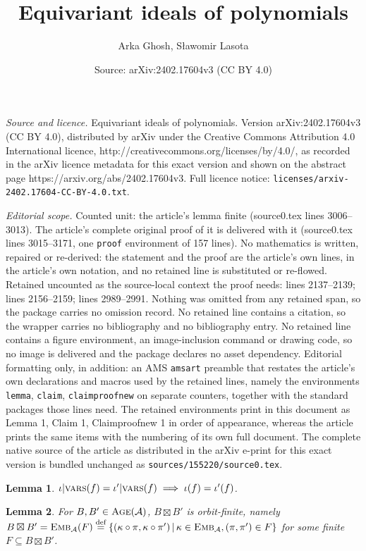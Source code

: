 \documentclass[10pt,a4paper]{amsart}
\title{Equivariant ideals of polynomials}
\author{Arka Ghosh, S{\l}awomir Lasota}
\date{Source: arXiv:2402.17604v3 (CC BY 4.0)}
\newtheorem{lemma}{Lemma}
\newcommand{\E}{{\embed{\WW}}}
\newcommand{\Vs}{B}
\newcommand{\WW}{\mathcal{A}}
\newcommand{\age}[1]{\text{\sc Age}(#1)}
\newcommand{\defeq}{\stackrel{\text{\tiny def}}{=}}
\newcommand{\embed}[1]{\text{\sc Emb}_{#1}}
\newcommand{\embsetprod}[2]{#1\boxtimes #2}
\newcommand{\restr}[2]{{#1}{|#2}}
\newcommand{\setof}[2]{\left\{#1 \, \middle\vert \, #2\right\}}
\newcommand{\vars}[1]{\text{\sc vars}(#1)}
\begin{document}
\maketitle

\noindent\emph{Source and licence.} Equivariant ideals of polynomials. Version arXiv:2402.17604v3 (CC BY 4.0), distributed by arXiv under the Creative Commons Attribution 4.0 International licence, http://creativecommons.org/licenses/by/4.0/, as recorded in the arXiv licence metadata for this exact version and shown on the abstract page https://arxiv.org/abs/2402.17604v3. Full licence notice: \texttt{licenses/arxiv-2402.17604-CC-BY-4.0.txt}.\par\smallskip

\noindent\textit{Editorial scope.} Counted unit: the article's lemma finite (source0.tex lines 3006--3013). The article's complete original proof of it is delivered with it (source0.tex lines 3015--3171, one \texttt{proof} environment of 157 lines). No mathematics is written, repaired or re-derived: the statement and the proof are the article's own lines, in the article's own notation, and no retained line is substituted or re-flowed.  Retained uncounted as the source-local context the proof needs: lines 2137--2139; lines 2156--2159; lines 2989--2991.  Nothing was omitted from any retained span, so the package carries no omission record.  No retained line contains a citation, so the wrapper carries no bibliography and no bibliography entry.  No retained line contains a figure environment, an image-inclusion command or drawing code, so no image is delivered and the package declares no asset dependency.  Editorial formatting only, in addition: an AMS \texttt{amsart} preamble that restates the article's own declarations and macros used by the retained lines, namely the environments \texttt{lemma}, \texttt{claim}, \texttt{claimproofnew} on separate counters, together with the standard packages those lines need.  The retained environments print in this document as Lemma 1, Claim 1, Claimproofnew 1 in order of appearance, whereas the article prints the same items with the numbering of its own full document.  The complete native source of the article as distributed in the arXiv e-print for this exact version is bundled unchanged as \texttt{sources/155220/source0.tex}.
\begin{lemma} \label{lem:restr}
$\restr \iota {\vars f} = \restr {\iota'} {\vars f} \implies \iota(f) = \iota'(f)$.
\end{lemma}

\begin{lemma} \label{lem:embsetprod}
For $\Vs, \Vs'\in\age \WW$,  $\embsetprod \Vs  {\Vs'}$ is orbit-finite, namely
$\embsetprod \Vs  {\Vs'} = \E(F) \defeq \setof{(\kappa\circ\pi,\kappa\circ\pi')}{\kappa\in\E, (\pi, \pi')\in F}$ for some finite  $F\subseteq \embsetprod \Vs {\Vs'}$.
\end{lemma}
\end{document}
